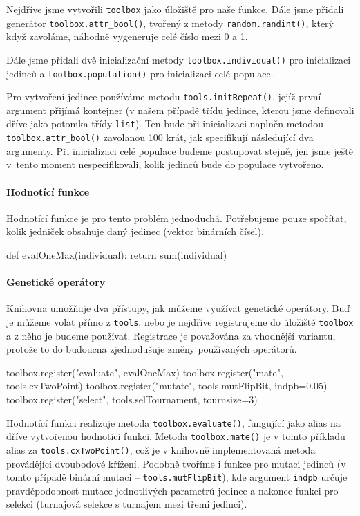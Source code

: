 Nejdříve jsme vytvořili \texttt{toolbox} jako úložiště pro naše funkce. Dále
jsme přidali generátor \texttt{toolbox.attr\_bool()}, tvořený z metody
\texttt{random.randint()}, který když zavoláme, náhodně vygeneruje celé číslo
mezi 0 a 1.

Dále jsme přidali dvě inicializační metody \texttt{toolbox.individual()} pro
inicializaci jedinců a \texttt{toolbox.population()} pro inicializaci celé
populace. 

Pro vytvoření jedince používáme metodu \texttt{tools.initRepeat()}, jejíž první
argument přijímá kontejner (v našem případě třídu jedince, kterou jsme
definovali dříve jako potomka třídy \texttt{list}). Ten bude při inicializaci
naplněn metodou \texttt{toolbox.attr\_bool()} zavolanou 100 krát, jak
specifikují následující dva argumenty. Při inicializaci celé populace budeme
postupovat stejně, jen jsme ještě v~tento moment nespecifikovali, kolik jedinců
bude do populace vytvořeno.

\paragraph{Hodnotící funkce}
Hodnotící funkce je pro tento problém jednoduchá. Potřebujeme pouze spočítat,
kolik jedniček obsahuje daný jedinec (vektor binárních čísel).

\begin{code}
def evalOneMax(individual):
    return sum(individual)
\end{code}

\paragraph{Genetické operátory}
Knihovna umožňuje dva přístupy, jak můžeme využívat genetické operátory. Buď je
můžeme volat přímo z \texttt{tools}, nebo je nejdříve registrujeme do úložiště
\texttt{toolbox} a z něho je budeme používat. Registrace je považována za
vhodnější variantu, protože to do budoucna zjednodušuje změny používaných
operátorů.

\begin{code}
toolbox.register("evaluate", evalOneMax)
toolbox.register("mate", tools.cxTwoPoint)
toolbox.register("mutate", tools.mutFlipBit, indpb=0.05)
toolbox.register("select", tools.selTournament, tournsize=3)
\end{code}

Hodnotící funkci realizuje metoda \texttt{toolbox.evaluate()}, fungující jako
alias na dříve vytvořenou hodnotící funkci. Metoda \texttt{toolbox.mate()} je v
tomto příkladu alias za \texttt{tools.cxTwoPoint()}, což je v knihovně
implementovaná metoda provádějící dvoubodové křížení. Podobně tvoříme i funkce
pro mutaci jedinců (v tomto případě binární mutaci --
\texttt{tools.mutFlipBit}), kde argument \texttt{indpb} určuje pravděpodobnost
mutace jednotlivých parametrů jedince a nakonec funkci pro selekci (turnajová
selekce s turnajem mezi třemi jedinci).
        
